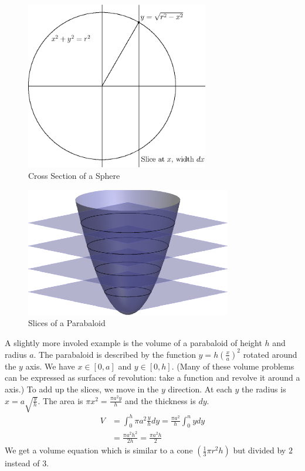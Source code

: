 \documentclass[fleqn]{report}
\begin{document}
\begin{figure}[t]
\centering
\includegraphics[width=8cm]{figure19.eps}
\caption{Cross Section of a Sphere}
\label{figure-cross-secdtion-sphere}
\end{figure}

\begin{figure}[ht]
\centering
\includegraphics[width=9cm]{figure20.eps}
\caption{Slices of a Parabaloid}
\label{figure-slices-parabaloid}
\end{figure}

\begin{example}
A slightly more involed example is the volume of a parabaloid of
height $h$ and radius $a$. The parabaloid is described by the
function $y = h \left(\frac{x}{a}\right)^2$ rotated around the
$y$ axis. We have $x \in [0, a]$ and $y \in [0, h]$. (Many of
these volume problems can be expressed as surfaces of
revolution: take a function and revolve it around a axis.) To
add up the slices, we move in the $y$ direction. At each $y$
the radius is $x = a\sqrt{\frac{y}{h}}$. The area is $\pi x^2
= \frac{\pi a^2 y}{h}$ and the thickness is $dy$.
\begin{align*}
V & = \int_0^h \pi a^2 \frac{y}{h} dy = \frac{\pi a^2}{h}
\int_0^n y dy \\
& = \frac{\pi a^2 h^2}{2h} = \frac{\pi a^2 h}{2}
\end{align*}
We get a volume equation which is similar to a cone
$\left(\frac{1}{3} \pi r^2 h\right)$ but divided by $2$
instead of $3$.
\end{example}
\end{document}
